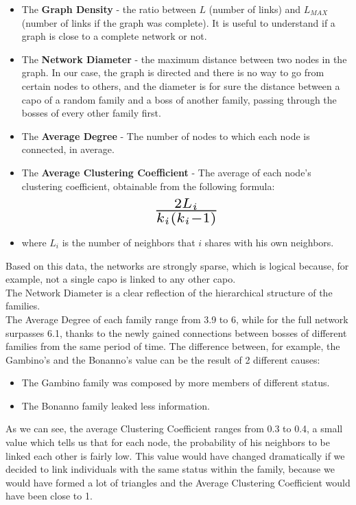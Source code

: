 \documentclass{article}
\begin{document}
\begin{itemize}
    \item The \textbf{Graph Density} - the ratio between $L$ (number of links) and $L_{MAX}$ (number of links if the graph was complete). It is useful to understand if a graph is close to a complete network or not.
    \item The \textbf{Network Diameter} - the maximum distance between two nodes in the graph. In our case, the graph is directed and there is no way to go from certain nodes to others, and the diameter is for sure the distance between a capo of a random family and a boss of another family, passing through the bosses of every other family first.
    \item The \textbf{Average Degree} - The number of nodes to which each node is connected, in average.
    \item The \textbf{Average Clustering Coefficient} - The average of each node's clustering coefficient, obtainable from the following formula: 
\begin{equation*}
    \centering \scalebox{2}{$\frac{2L_i}{k_i(k_i-1)}$}
\end{equation*}
    \item[] where $L_i$ is the number of neighbors that $i$ shares with his own neighbors.
\end{itemize}



\noindent
Based on this data, the networks are strongly sparse, which is logical because, for example, not a single capo is linked to any other capo.\\
The Network Diameter is a clear reflection of the hierarchical structure of the families.\\
The Average Degree of each family range from 3.9 to 6, while for the full network surpasses 6.1, thanks to the newly gained connections between bosses of different families from the same period of time. The difference between, for example, the Gambino's and the Bonanno's value can be the result of 2 different causes:
\begin{itemize}
    \item The Gambino family was composed by more members of different status.
    \item The Bonanno family leaked less information.\\
\end{itemize}



\noindent
As we can see, the average Clustering Coefficient ranges from 0.3 to 0.4, a small value which tells us that for each node, the probability of his neighbors to be linked each other is fairly low. This value would have changed dramatically if we decided to link individuals with the same status within the family, because we would have formed a lot of triangles and the Average Clustering Coefficient would have been close to 1. 
\newpage
\pagecolor{white}
\end{document}
